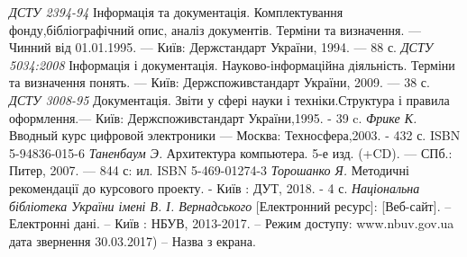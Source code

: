 \begin{thebibliography}{99}
 \textit{ДСТУ 2394-94} Інформація та документація. Комплектування фонду,бібліографічний опис, аналіз документів. Терміни та визначення. — Чинний від
01.01.1995. — Київ: Держстандарт України, 1994. — 88 с.
 \textit{ДСТУ 5034:2008 } Інформація і документація. Науково-інформаційна діяльність.
Терміни та визначення понять. — Київ: Держспоживстандарт України, 2009. — 38 с.
 \textit{ДСТУ 3008-95} Документація.
Звіти у сфері науки і техніки.Структура і правила оформлення.— Київ: Держспоживстандарт України,1995. - 39 c.
 \textit{Фрике К.} Вводный курс цифровой электроники — Москва:
Техносфера,2003. - 432 с. ISBN 5-94836-015-6
 \textit{Таненбаум Э.} Архитектура компьютера. 5-е изд. (+CD). — СПб.: Питер, 2007. — 844 с: ил. ISBN 5-469-01274-3 
\textit{Торошанко Я.} Методичні рекомендації до курсового проекту. -
Київ : ДУТ, 2018. - 4 с.
\textit{Національна бібліотека України імені В. І. Вернадського} [Електронний
ресурс]: [Веб-сайт]. – Електронні дані. – Київ : НБУВ, 2013-2017. – Режим доступу:
www.nbuv.gov.ua дата звернення 30.03.2017) – Назва з екрана.
\end{thebibliography}